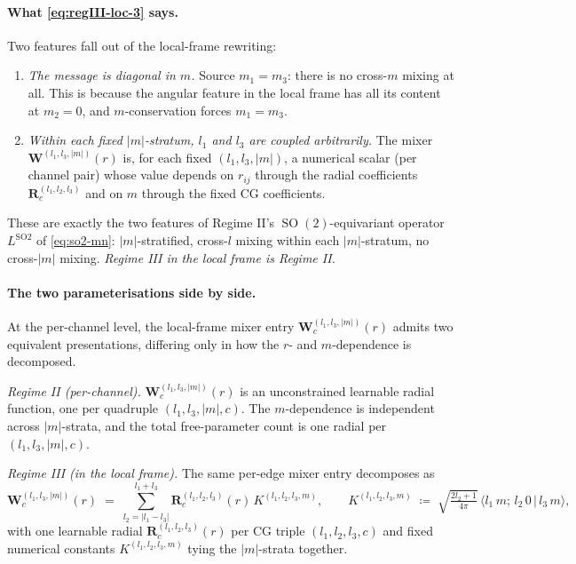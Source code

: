 \documentclass[11pt,a4paper]{article}
\DeclareMathOperator{\SO}{SO}
\theoremstyle{plain}
\theoremstyle{definition}
\theoremstyle{remark}
\begin{document}
    \paragraph{What \eqref{eq:regIII-loc-3} says.} Two features fall out of the local-frame rewriting:
    \begin{enumerate}[leftmargin=2em]
    \item \emph{The message is diagonal in $m$.}
    Source $m_1=m_3$: there is no cross-$m$ mixing at all.
    This is because the angular feature in the local frame has all its content at $m_2=0$, and $m$-conservation forces $m_1=m_3$.
    \item \emph{Within each fixed $|m|$-stratum, $l_1$ and $l_3$ are coupled arbitrarily.}
    The mixer $\bm{W}^{(l_1,l_3,|m|)}(r)$ is, for each fixed $(l_1,l_3,|m|)$, a numerical scalar (per channel pair) whose value depends on $r_{ij}$ through the radial coefficients $\bm{R}^{(l_1,l_2,l_3)}_c$ and on $m$ through the fixed CG coefficients.
    \end{enumerate}
    These are exactly the two features of Regime II's $\SO(2)$-equivariant operator $L^{\mathrm{SO2}}$ of \eqref{eq:so2-mn}: $|m|$-stratified, cross-$l$ mixing within each $|m|$-stratum, no cross-$|m|$ mixing.
    \emph{Regime III in the local frame is Regime II.}

    \paragraph{The two parameterisations side by side.}
    At the per-channel level, the local-frame mixer entry
$\bm{W}^{(l_1,l_3,|m|)}_c(r)$ admits two equivalent presentations, differing
    only in how the $r$- and $m$-dependence is decomposed.

    \medskip
    \noindent
    \emph{Regime II (per-channel).}
$\bm{W}^{(l_1,l_3,|m|)}_c(r)$ is an unconstrained learnable radial function, one per quadruple $(l_1,l_3,|m|,c)$.
    The $m$-dependence is independent across $|m|$-strata, and the total free-parameter count is one radial per $(l_1,l_3,|m|,c)$.

    \medskip
    \noindent
    \emph{Regime III (in the local frame).}
    The same per-edge mixer entry decomposes as
    \begin{equation}\label{eq:W-vs-R}
        \bm{W}^{(l_1,l_3,|m|)}_c(r)\;=\;\sum_{l_2=|l_1-l_3|}^{l_1+l_3}\bm{R}^{(l_1,l_2,l_3)}_c(r)\,K^{(l_1,l_2,l_3,m)},\qquad
        K^{(l_1,l_2,l_3,m)}\;\coloneqq\;\sqrt{\tfrac{2l_2+1}{4\pi}}\,\langle l_1\,m;\,l_2\,0\,|\,l_3\,m\rangle,
    \end{equation}
    with one learnable radial $\bm{R}^{(l_1,l_2,l_3)}_c(r)$ per CG triple $(l_1,l_2,l_3,c)$ and fixed numerical constants $K^{(l_1,l_2,l_3,m)}$ tying the $|m|$-strata together.
\end{document}
